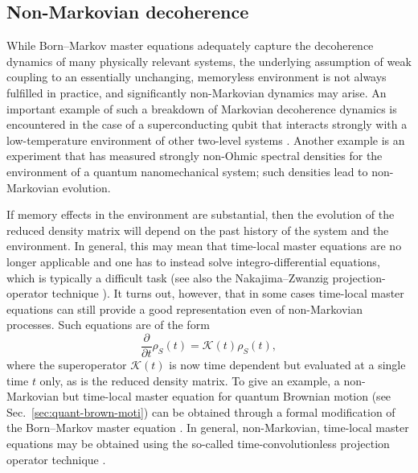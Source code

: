 \documentclass[3p,sort&compress,12pt]{elsarticle}
\newcommand{\op}[1]{#1}
\begin{document}
\subsection{\label{sec:non-mark-decoh}Non-Markovian decoherence}

While Born--Markov master equations adequately capture the decoherence dynamics of many physically relevant systems, the underlying assumption of weak coupling to an essentially unchanging, memoryless environment is not always fulfilled in practice, and significantly non-Markovian dynamics may arise. An important example of such a breakdown of Markovian decoherence dynamics is encountered in the case of a superconducting qubit that interacts strongly with a low-temperature environment of other two-level systems \cite{Prokofev:2000:zz,Dube:2001:zz}. Another example is an experiment \cite{Groeblacher:2013:im} that has measured strongly non-Ohmic spectral densities for the environment of a quantum nanomechanical system; such densities lead to non-Markovian evolution. 

If memory effects in the environment are substantial, then the evolution of the reduced density matrix will depend on the past history of the system and the environment. In general, this may mean that time-local master equations are no longer  applicable and one has to instead solve integro-differential equations, which is typically a difficult task (see also the Nakajima--Zwanzig projection-operator technique
\cite{Nakajima:1958:im,Zwanzig:1960:om,Zwanzig:1960:mo,Joos:2003:jh}). It turns out, however, that in some cases time-local master equations can still provide a good representation even of non-Markovian processes. Such equations are  of the form
%
\begin{equation}
\label{eq:sfihvsfhv7}
  \frac{\partial}{\partial t} \op{\rho}_S(t) = \mathcal{K}(t) \op{\rho}_S(t),
\end{equation}
%
where the superoperator $\mathcal{K}(t)$ is now time dependent but evaluated at a single time $t$ only, as is the reduced density matrix. To give an example, a non-Markovian but time-local master equation  for quantum Brownian motion (see Sec.~\ref{sec:quant-brown-moti}) can be obtained through a formal modification of the Born--Markov master equation \cite{Paz:2001:aa,Zurek:2002:ii}. In general, non-Markovian, time-local master equations may be obtained using the so-called time-convolutionless projection operator technique \cite{Chaturvedi:1979:pm,Shibata:1980:ma,Royer:1972:um,Royer:2003:za}. 
\end{document}

